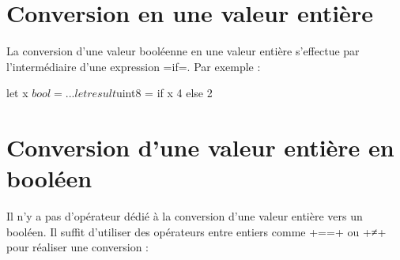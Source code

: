 \section{Conversion en une valeur entière}

La conversion d'une valeur booléenne en une valeur entière s'effectue par l'intermédiaire d'une expression \plm=if=. Par exemple :

\begin{PLM}
let x $bool = ...
let result $uint8 = if x { 4 }else{ 2 }
\end{PLM}


\section{Conversion d'une valeur entière en booléen}

Il n'y a pas d'opérateur dédié à la conversion d'une valeur entière vers un booléen. Il suffit d'utiliser des opérateurs entre entiers comme \plm+==+ ou \plm+≠+ pour réaliser une conversion :



